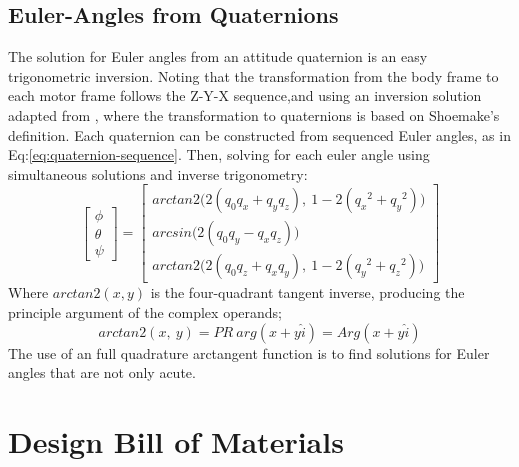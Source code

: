 \section{Euler-Angles from Quaternions}
\label{app:equations.quaternions}
The solution for Euler angles from an attitude quaternion is an easy trigonometric inversion. Noting that the transformation from the body frame to each motor frame follows the Z-Y-X sequence,and using an inversion solution adapted from \cite{computingeuler}, where the transformation to quaternions is based on Shoemake's\cite{shoemake} definition. Each quaternion can be constructed from sequenced Euler angles, as in Eq:\ref{eq:quaternion-sequence}.
Then, solving for each euler angle using simultaneous solutions and inverse trigonometry:
\begin{equation}\label{eq:app-quaternion-eule}
\begin{bmatrix}
\phi\\
\theta\\
\psi
\end{bmatrix}
=
\begin{bmatrix}
arctan2\big(2(q_0q_x+q_yq_z),~1-2(q_x\text{}^2+q_y\text{}^2)\big)\\
arcsin\big(2(q_0q_y-q_xq_z)\big)\\
arctan2\big(2(q_0q_z+q_xq_y),~1-2(q_y\text{}^2+q_z\text{}^2)\big)
\end{bmatrix}
\end{equation}
Where $arctan2(x,y)$ is the four-quadrant tangent inverse\cite{atan2}, producing the principle argument of the complex operands;
\begin{equation}
arctan2(x,~y)=PR~arg(x+y\hat{i})=Arg(x+y\hat{i})
\end{equation}
The use of an full quadrature arctangent function is to find solutions for Euler angles that are not only acute.
\chapter{Design Bill of Materials}
\label{app:bom}
